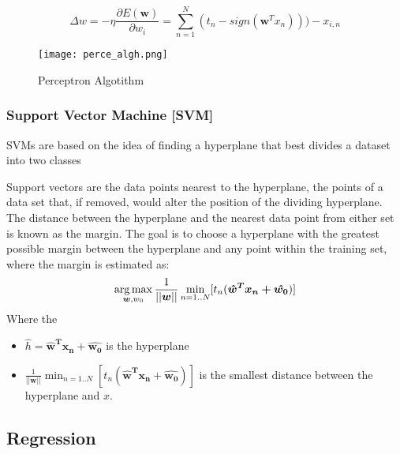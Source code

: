 \[\Delta w=-\eta \frac{\partial E(\bm{w}) }{\partial w_i}=\sum_{n=1}^N(t_n-sign(\bm{w}^Tx_n)))-x_{i,n} \]

\begin{figure}[H]
\texttt{[image: perce\_algh.png]}
\caption{Perceptron Algotithm}
\end{figure}

\subsubsection{Support Vector Machine [SVM]}
SVMs are based on the idea of finding a hyperplane that best divides a dataset into two classes


\begin{figure}[H]
    \centering
    \qquad

\label{fig:linear_problem}%
\end{figure}

Support vectors are the data points nearest to the hyperplane, the points of a data set that, if removed, would alter the position of the dividing hyperplane.\\
The distance between the hyperplane and the nearest data point from either set is known as the margin. The goal is to choose a hyperplane with the greatest possible margin between the hyperplane and any point within the training set, where the margin is estimated as:
\[\operatorname*{arg\,max}_{\bm{w},w_0}\frac{1}{||\bm{w}||}\min_{n=1..N}[t_n(\bm{\hat{w}^Tx_n+\hat{w_0}})]\]
Where the
\begin{itemize}
\item $\hat{h}=\bm{\hat{w}^Tx_n+\hat{w_0}}$ is the hyperplane
\item $\frac{1}{||\bm{w}||}\min_{n=1..N}[t_n(\bm{\hat{w}^Tx_n+\hat{w_0}})]$ is the smallest distance between the hyperplane and $x$.

\end{itemize}

\subsection{Regression}

 

